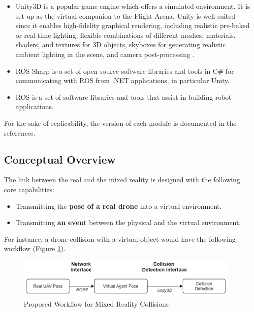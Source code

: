\begin{itemize}
    \item Unity3D \cite{unity3d} is a popular game engine which offers a simulated environment. It is set up as the virtual companion to the Flight Arena. Unity is well suited since it enables high-fidelity graphical rendering, including realistic pre-baked or real-time lighting, flexible combinations of different meshes, materials, shaders, and textures for 3D objects, skyboxes for generating realistic ambient lighting in the scene, and camera post-processing \cite{flightmare}.
    
    \item ROS Sharp \cite{rossharp} is a set of open source software libraries and tools in C\# for communicating with ROS from .NET applications, in particular Unity.
    
    \item ROS \cite{ros} is a set of software libraries and tools that assist in building robot applications.
\end{itemize}

For the sake of replicability, the version of each module is documented in the references.

\subsection{Conceptual Overview}

The link between the real and the mixed reality is designed with the following core capabilities:
\begin{itemize}
    \item Transmitting the \textbf{pose of a real drone} into a virtual environment.
    \item Transmitting \textbf{an event} between the physical and the virtual environment.
\end{itemize}


For instance, a drone collision with a virtual object would have the following workflow (Figure \ref{proposed_workflow}).

\begin{figure}[h]
    \raggedright
    \includegraphics[width=11cm]{images/xr_system/collision_workflow.png}
    \caption{Proposed Workflow for Mixed Reality Collisions}
    \label{proposed_workflow}
\end{figure}

